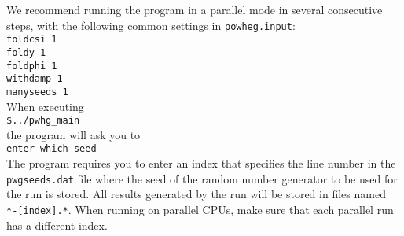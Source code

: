 \documentclass[a4paper,11pt]{article}
\begin{document}
We recommend running the program in a parallel mode in several consecutive steps, with the following common settings in {\tt powheg.input}:
\\[2ex]
{\tt foldcsi   1}
\\
{\tt foldy     1}
\\
{\tt foldphi   1}
\\
{\tt withdamp   1}
\\
{\tt manyseeds   1}
\\[2ex]
When executing
\\[2ex]
{\tt \$../pwhg\_main}
\\[2ex]
the program will ask you to
\\[2ex]
{\tt enter which seed}
\\[2ex]
The program requires you to enter an index that specifies the line
number in the {\tt pwgseeds.dat} file where the seed of the random
number generator to be used for the run is stored. All results
generated by the run will be stored in files named {\tt
  *-[index].*}. When running on parallel CPUs, make sure that each
parallel run has a different index.
% 
\end{document}
